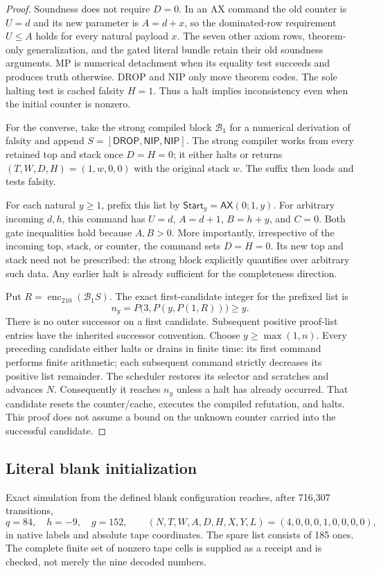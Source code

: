 \begin{proof}
Soundness does not require $D=0$. In an AX command the old counter is $U=d$ and its new parameter is $A=d+x$, so the dominated-row requirement $U\le A$ holds for every natural payload $x$. The seven other axiom rows, theorem-only generalization, and the gated literal bundle retain their old soundness arguments. MP is numerical detachment when its equality test succeeds and produces truth otherwise. DROP and NIP only move theorem codes. The sole halting test is cached falsity $H=1$. Thus a halt implies inconsistency even when the initial counter is nonzero.

For the converse, take the strong compiled block $\mathcal B_1$ for a numerical derivation of falsity and append $S=[\mathsf{DROP},\mathsf{NIP},\mathsf{NIP}]$. The strong compiler works from every retained top and stack once $D=H=0$; it either halts or returns $(T,W,D,H)=(1,w,0,0)$ with the original stack $w$. The suffix then loads and tests falsity.

For each natural $y\ge1$, prefix this list by
$\mathsf{Start}_y=\mathsf{AX}(0;1,y)$. For arbitrary incoming $d,h$, this command has $U=d$, $A=d+1$, $B=h+y$, and $C=0$. Both gate inequalities hold because $A,B>0$. More importantly, irrespective of the incoming top, stack, or counter, the command sets $D=H=0$. Its new top and stack need not be prescribed: the strong block explicitly quantifies over arbitrary such data. Any earlier halt is already sufficient for the completeness direction.

Put $R=\operatorname{enc}_{210}(\mathcal B_1S)$. The exact first-candidate integer for the prefixed list is
\[
 n_y=P\bigl(3,P(y,P(1,R))\bigr)\ge y.
\]
There is no outer successor on a first candidate. Subsequent positive proof-list entries have the inherited successor convention. Choose $y\ge\max(1,n)$. Every preceding candidate either halts or drains in finite time: its first command performs finite arithmetic; each subsequent command strictly decreases its positive list remainder. The scheduler restores its selector and scratches and advances $N$. Consequently it reaches $n_y$ unless a halt has already occurred. That candidate resets the counter/cache, executes the compiled refutation, and halts. This proof does not assume a bound on the unknown counter carried into the successful candidate.
\end{proof}

\subsection{Literal blank initialization}
Exact simulation from the defined blank configuration reaches, after 716,307 transitions,
\[
 q=84,\quad h=-9,\quad g=152,\qquad
 (N,T,W,A,D,H,X,Y,L)=(4,0,0,0,1,0,0,0,0),
\]
in native labels and absolute tape coordinates. The spare list consists of 185 ones. The complete finite set of nonzero tape cells is supplied as a receipt and is checked, not merely the nine decoded numbers.


